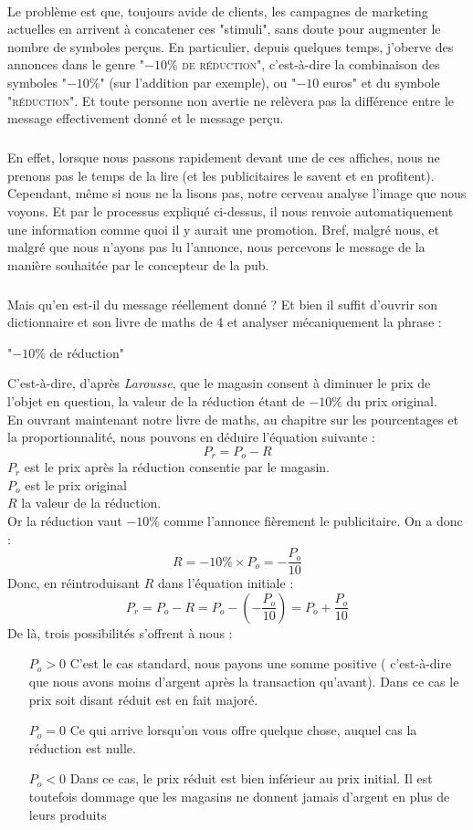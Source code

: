 \documentclass{article}
\begin{document}
\paragraph*{}
Le problème est que, toujours avide de clients, les campagnes de marketing 
actuelles en arrivent à concatener ces "stimuli", sans doute pour augmenter le 
nombre de symboles perçus. En particulier, depuis quelques temps, j'oberve des 
annonces dans le genre "\textsc{$-10\%$ de réduction}", c'est-à-dire la 
combinaison des symboles "$-10\%$" (sur l'addition par exemple), ou "$-10$ euros"
et du symbole "\textsc{réduction}". Et toute personne non avertie ne relèvera 
pas la différence entre le message effectivement donné et le message perçu.
\subparagraph*{}
En effet, lorsque nous passons rapidement devant une de ces affiches, nous ne 
prenons pas le temps de la lire (et les publicitaires le savent et en 
profitent).
Cependant, même si nous ne la lisons pas, notre cerveau analyse l'image que nous
voyons. Et par le processus expliqué ci-dessus, il nous renvoie automatiquement
une information comme quoi il y aurait une promotion. Bref, malgré nous, et 
malgré que nous n'ayons pas lu l'annonce, nous percevons le message de la 
manière souhaitée par le concepteur de la pub.
\subparagraph*{}
Mais qu'en est-il du message réellement donné ? Et bien il suffit d'ouvrir son 
dictionnaire et son livre de maths de 4 et analyser mécaniquement la 
phrase : \\
\begin{center}
"$-10\%$ de réduction"\\
\end{center}
C'est-à-dire, d'après \emph{Larousse}, que le magasin consent à diminuer le prix
de l'objet en question, la valeur de la réduction étant de $-10\%$ du prix 
original.\\
En ouvrant maintenant notre livre de maths, au chapitre sur les pourcentages et 
la proportionnalité, nous pouvons en déduire l'équation suivante : 
$$P_r = P_o - R $$
$P_r$ est le prix après la réduction consentie par le magasin.\\
$P_o$ est le prix original\\
$R$ la valeur de la réduction.\\ 
Or la réduction vaut $-10\%$
comme l'annonce fièrement le publicitaire. On a donc : 
$$R = -10\% \times P_o = -\frac{P_o}{10}$$
Donc, en réintroduisant $R$ dans l'équation initiale :
$$P_r = P_o - R = P_o - \left(-\frac{P_o}{10}\right) = P_o + \frac{P_o}{10}$$
De là, trois possibilités s'offrent à nous : 
\begin{itemize}
	\item[$P_o > 0$]{C'est le cas standard, nous payons une somme positive (
		c'est-à-dire que nous avons moins d'argent après la transaction 
		qu'avant). Dans ce cas le prix soit disant réduit est en fait 
		majoré.}
	\item[$P_o = 0$]{Ce qui arrive lorsqu'on vous offre quelque chose, 
		auquel cas la réduction est nulle.}
	\item[$P_o < 0$]{Dans ce cas, le prix réduit est bien inférieur au prix 
			initial. Il est toutefois dommage que les magasins ne 
		donnent jamais d'argent en plus de leurs produits}
\end{itemize}
\end{document}
